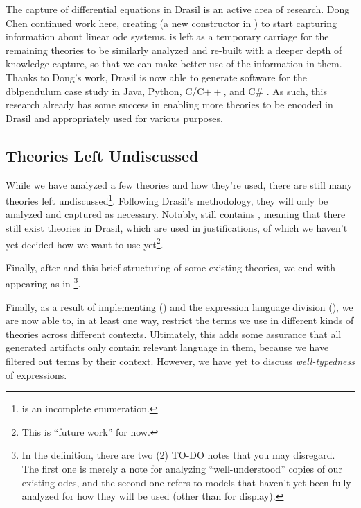 The capture of differential equations in Drasil is an active area of research.
Dong Chen continued work here, creating \NewDEModel{} \cite{Chen2022MEng} (a new
constructor in \ModelKinds{}) to start capturing information about linear
\acs{ode} systems. \DEModel{} is left as a temporary carriage for the remaining
theories to be similarly analyzed and re-built with a deeper depth of knowledge
capture, so that we can make better use of the information in them. Thanks to
Dong's work, Drasil is now able to generate software for the \acs{dblpendulum}
case study in Java, Python, C/C$++$, and C\# \cite{Chen2022MEng}. As such, this
research already has some success in enabling more theories to be encoded in
Drasil and appropriately used for various purposes.

\subsection{Theories Left Undiscussed}
\label{chap:more-theory-kinds:sec:classify-all-the-theories:subsec:theories-left-undiscussed}

While we have analyzed a few theories and how they're used, there are still many
theories left undiscussed\footnote{\ModelKinds{} is an incomplete enumeration.}.
Following Drasil's methodology, they will only be analyzed and captured as
necessary. Notably, \ModelKinds{} still contains \OthModel{}, meaning that there
still exist theories in Drasil, which are used in justifications, of which we
haven't yet decided how we want to use yet\footnote{This is ``future work'' for
now.}.

Finally, after  and this brief structuring of some
existing theories, we end with \ModelKinds{} appearing as in
\footnote{In the 
definition, there are two (2) TO-DO notes that you may disregard. The first one
is merely a note for analyzing ``well-understood'' copies of our existing
\acsp{ode}, and the second one refers to models that haven't yet been fully
analyzed for how they will be used (other than for display).}.

\currentModelKindsHaskell{}

Finally, as a result of implementing \ModelKinds{} () and
the expression language division (), we are now able
to, in at least one way, restrict the terms we use in different kinds of
theories across different contexts. Ultimately, this adds some assurance that
all generated artifacts only contain relevant language in them, because we have
filtered out terms by their context. However, we have yet to discuss
\textit{well-typedness} of expressions.
